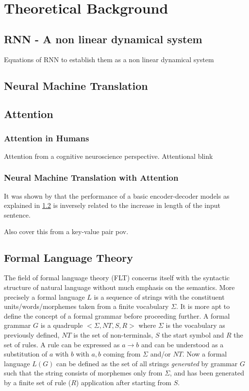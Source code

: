 \chapter{Theoretical Background} \label{Chapter:theory}

\section{RNN - A non linear dynamical system}
Equations of RNN to establish them as a non linear dynamical system

\section{Neural Machine Translation}\label{theory:nmt}

\section{Attention}

\subsection{Attention in Humans}
Attention from a cognitive neuroscience perspective. Attentional blink

\subsection{Neural Machine Translation with Attention}
It was shown by \cite{W14-4012} that the performance of a basic encoder-decoder models as explained in \ref{theory:nmt} is inversely related to the increase in length of the input sentence.

Also cover this from a key-value pair pov.

\section{Formal Language Theory}
The field of formal language theory (FLT) concerns itself with the syntactic structure of natural language without much emphasis on the semantics. More precisely a formal language $L$ is a sequence of strings with the constituent units/words/morphemes taken from a finite vocabulary $\Sigma$. It is more apt to define the concept of a formal grammar before proceeding further. A formal grammar $G$ is a quadruple $<\Sigma, NT, S, R>$ where $\Sigma$ is the vocabulary as previously defined, $NT$ is the set of non-terminals, $S$ the start symbol and $R$ the set of rules. A rule can be expressed as $a \rightarrow b$ and can be understood as a substitution of $a$ with $b$ with $a, b$ coming from $\Sigma$ and/or $NT$. Now a formal language $L(G)$ can be defined as the set of all strings  \textit{generated} by grammar $G$ such that the string consists of morphemes only from $\Sigma$, and has been generated by a finite set of rule ($R$) application after starting from $S$.

